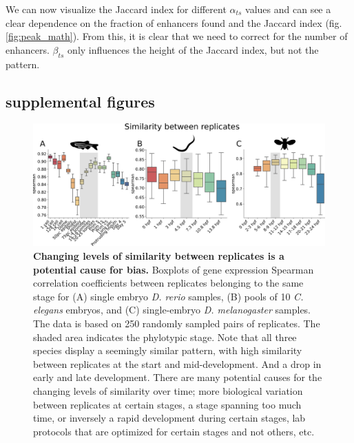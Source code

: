 We can now visualize the Jaccard index for different $\alpha_{ts}$ values and can see a clear dependence on the fraction of enhancers found and the Jaccard index (fig. \ref{fig:peak_math}). From this, it is clear that we need to correct for the number of enhancers. $\beta_{ts}$ only influences the height of the Jaccard index, but not the pattern.

\subsection{supplemental figures}
\beginsupplement

\begin{figure}[H]
    \center
    \includegraphics[width=\linewidth]{ch.hourglass/images/within_timepoint.png}
    \caption{\textbf{Changing levels of similarity between replicates is a potential cause for bias.} Boxplots of gene expression Spearman correlation coefficients between replicates belonging to the same stage for (A) single embryo \textit{D. rerio} samples, (B) pools of 10 \textit{C. elegans} embryos, and (C) single-embryo \textit{D. melanogaster} samples. The data is based on 250 randomly sampled pairs of replicates. The shaded area indicates the phylotypic stage. Note that all three species display a seemingly similar pattern, with high similarity between replicates at the start and mid-development. And a drop in early and late development. There are many potential causes for the changing levels of similarity over time; more biological variation between replicates at certain stages, a stage spanning too much time, or inversely a rapid development during certain stages, lab protocols that are optimized for certain stages and not others, etc.}
    \label{fig:within_timepoint}
\end{figure}

